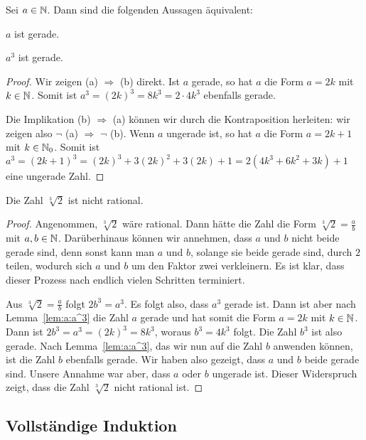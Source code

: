\begin{lem} \label{lem:a:a^3}
	Sei $a \in \mathbb{N}$. Dann sind die folgenden Aussagen äquivalent: 
	\begin{enuma}
		\item $a$ ist gerade. 
		\item $a^3$ ist gerade. 
	\end{enuma} 
\end{lem} 
\begin{proof} 
	Wir zeigen (a) $\Rightarrow$ (b) direkt. Ist $a$ gerade, so hat $a$ die Form $a = 2 k$ mit $k \in \mathbb{N}$. Somit ist $a^3 = (2 k)^3 = 8 k^3 = 2 \cdot 4 k^3$ ebenfalls gerade. 
	
	Die Implikation (b) $\Rightarrow$ (a) können wir durch die Kontraposition herleiten: wir zeigen also $\neg$ (a) $\Rightarrow$ $\neg$ (b). Wenn $a$ ungerade ist, so hat $a$ die Form $a = 2 k+1$ mit $k \in \mathbb{N}_0$. Somit ist $a^3  = (2k + 1)^3 = (2k)^3 + 3 (2k)^2 + 3 (2k) + 1 = 2 ( 4 k^3 + 6 k^2 + 3 k) + 1$ eine ungerade Zahl.  
\end{proof} 

\begin{thm}
	Die Zahl $\sqrt[3]{2}$ ist nicht rational. 
\end{thm} 
\begin{proof} 
	Angenommen, $\sqrt[3]{2}$ wäre rational. Dann hätte die Zahl die Form $\sqrt[3]{2} = \frac{a}{b}$ mit $a, b \in \mathbb{N}$. Darüberhinaus können wir annehmen, dass $a$ und $b$ nicht beide gerade sind, denn sonst kann man $a$ und $b$, solange sie beide gerade sind, durch $2$ teilen, wodurch sich $a$ und $b$ um den Faktor zwei verkleinern. Es ist klar, dass dieser Prozess nach endlich vielen Schritten terminiert. 
	
	Aus $\sqrt[3]{2} = \frac{a}{b}$ folgt $2 b^3  = a^3$. Es folgt also, dass $a^3$ gerade ist. Dann ist aber nach Lemma~\ref{lem:a:a^3} die Zahl $a$ gerade und hat somit die Form $a = 2 k$ mit $k \in \mathbb{N}$. Dann ist $2 b^3 = a^3 = (2k)^3 = 8 k^3$, woraus $b^3= 4 k^3$ folgt. Die Zahl $b^3$ ist also gerade. Nach Lemma~\ref{lem:a:a^3}, das wir nun auf die Zahl $b$ anwenden können, ist die Zahl $b$ ebenfalls gerade. Wir haben also gezeigt, dass $a$ und $b$ beide gerade sind. Unsere Annahme war aber, dass $a$ oder $b$ ungerade ist. Dieser Widerspruch zeigt, dass die Zahl $\sqrt[3]{2}$ nicht rational ist. 
\end{proof} 


\subsection{Vollständige Induktion} 


